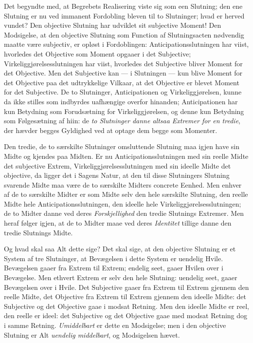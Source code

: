 \documentclass[12pt]{book}
\newcommand{\opage}[1]{\marginnote{\footnotesize\textit{[#1]}}}
\begin{document}
Det begyndte med, at Begrebets Realisering viste sig som een Slutning; den ene Slutning er nu ved immanent Fordobling bleven til to Slutninger; hvad er herved vundet? Den objective Slutning har udviklet sit subjective Moment! Den Modsigelse, at den objective Slutning som Function af Slutningsacten nødvendig maatte være subjectiv, er opløst i Fordoblingen: Anticipationsslutningen har viist, hvorledes det Objective som Moment opgaaer i det Subjective; Virkeliggjørelsesslutningen har viist, hvorledes det Subjective bliver Moment for det Objective. Men det Subjective kan --- i Slutningen --- kun blive Moment for det Objective paa det udtrykkelige Vilkaar, at det Objective er blevet Moment for det Subjective. De to Slutninger, Anticipationen og Virkeliggjørelsen, kunne da ikke stilles som indbyrdes uafhængige overfor hinanden; Anticipationen har kun Betydning som Forudsætning for Virkeliggjørelsen, og denne kun Betydning som Følgesætning af hiin: de \emph{to Slutninger danne altsaa Extremer for en tredie}, der hævder begges Gyldighed ved at optage dem begge som Momenter.

Den tredie, de to særskilte Slutninger omsluttende Slutning maa igjen have sin Midte og kjendes paa Midten. Er nu Anticipationsslutningen med sin reelle Midte det subjective Extrem, Virkeliggjørelsesslutningen med sin ideelle Midte det objective, da ligger det i Sagens Natur, at den til disse Slutningers Slutning svarende Midte maa være de to særskilte Midters concrete Eenhed. Men enhver af de to særskilte Midter er som Midte selv den hele særskilte Slutning, den reelle Midte hele Anticipationsslutningen, den ideelle hele Virkeliggjørelsesslutningen; de to Midter danne ved deres \emph{Forskjellighed} den tredie Slutnings Extremer. Men heraf
\opage{406}følger igjen, at de to Midter maae ved deres \emph{Identitet} tillige danne den tredie Slutnings Midte.

Og hvad skal saa Alt dette sige? Det skal sige, at den objective Slutning er et System af tre Slutninger, at Bevægelsen i dette System er uendelig Hvile. Bevægelsen gaaer fra Extrem til Extrem; endelig seet, gaaer Hvilen over i Bevægelse. Men ethvert Extrem er selv den hele Slutning: uendelig seet, gaaer Bevægelsen over i Hvile. Det Subjective gaaer fra Extrem til Extrem gjennem den reelle Midte, det Objective fra Extrem til Extrem gjennem den ideelle Midte: det Subjective og det Objective gaae i modsat Retning. Men den ideelle Midte er reel, den reelle er ideel: det Subjective og det Objective gaae med modsat Retning dog i samme Retning. \emph{Umiddelbart} er dette en Modsigelse; men i den objective Slutning er Alt \emph{uendelig middelbart}, og Modsigelsen hævet.
\end{document}
